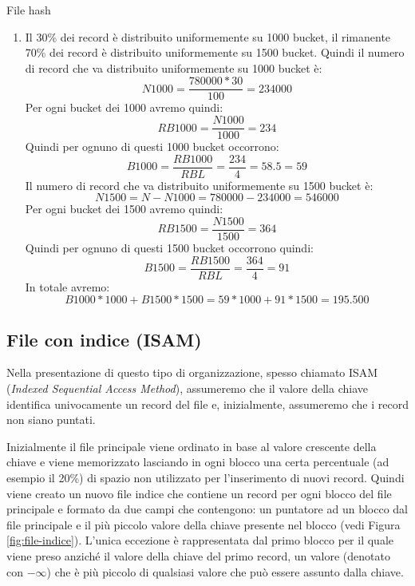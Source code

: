 \begin{Example}{File hash}{}
\begin{enumerate}[label=(\alph*)]
        \item Il 30\% dei record è distribuito uniformemente su 1000 bucket, il rimanente 70\% dei record è distribuito uniformemente su 1500 bucket. Quindi il numero di record che va distribuito uniformemente su 1000 bucket è:
        \begin{equation*}
            N1000=\frac{780000*30}{100}=234000
        \end{equation*}
        Per ogni bucket dei 1000 avremo quindi:
        \begin{equation*}
            RB1000=\frac{N1000}{1000}=234
        \end{equation*}
        Quindi per ognuno di questi 1000 bucket occorrono:
        \begin{equation*}
            B1000=\frac{RB1000}{RBL}=\frac{234}{4}=58.5=59
        \end{equation*}
        Il numero di record che va distribuito uniformemente su 1500 bucket è:
        \begin{equation*}
            N1500=N-N1000=780000-234000=546000
        \end{equation*}
        Per ogni bucket dei 1500 avremo quindi:
        \begin{equation*}
            RB1500=\frac{N1500}{1500}=364
        \end{equation*}
        Quindi per ognuno di questi 1500 bucket occorrono quindi:
        \begin{equation*}
            B1500=\frac{RB1500}{RBL}=\frac{364}{4}=91
        \end{equation*}
        In totale avremo:
        \begin{equation*}
            B1000 * 1000 + B1500 * 1500 = 59 * 1000 + 91 * 1500 = 195.500
        \end{equation*}
    \end{enumerate}
\end{Example}

\subsection{File con indice (ISAM)}
Nella presentazione di questo tipo di organizzazione, spesso chiamato ISAM (\textit{Indexed Sequential Access Method}), assumeremo che il valore della chiave identifica univocamente un record del file e, inizialmente, assumeremo che i record non siano puntati. 

Inizialmente il file principale viene ordinato in base al valore crescente della chiave e viene memorizzato lasciando in ogni blocco una certa percentuale (ad esempio il 20\%) di spazio non utilizzato per l'inserimento di nuovi record. Quindi viene creato un nuovo file indice che contiene un record per ogni blocco del file principale e formato da due campi che contengono: un puntatore ad un blocco dal file principale e il più piccolo valore della chiave presente nel blocco (vedi Figura \ref{fig:file-indice}). L'unica eccezione è rappresentata dal primo blocco per il quale viene preso anziché il valore della chiave del primo record, un valore (denotato con $-\infty$) che è più piccolo di qualsiasi valore che può essere assunto dalla chiave.

